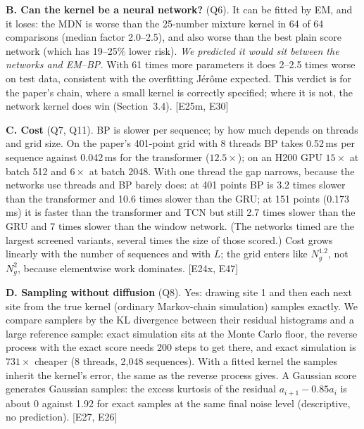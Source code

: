 \documentclass[11pt,a4paper]{article}
\newcommand{\src}[1]{{\footnotesize\color{gray}[#1]}}
\newcommand{\fals}[1]{{\small\itshape #1}}
\begin{document}
\textbf{B. Can the kernel be a neural network?} (Q6). It can be fitted by EM, and it loses: the MDN is worse than the 25-number
mixture kernel in 64 of 64 comparisons (median factor 2.0--2.5), and also worse than the best plain score network (which has
19--25\% lower risk). \fals{We predicted it would sit between the networks and EM--BP.} With 61 times more parameters it does 2--2.5 times worse on test data, consistent with the overfitting Jérôme expected. This verdict is for the paper's chain, where a small kernel is
correctly specified; where it is not, the network kernel does win (Section~3.4). \src{E25m, E30}

\textbf{C. Cost} (Q7, Q11). BP is slower per sequence; by how much depends on threads and grid size. On the paper's 401-point grid
with 8 threads BP takes 0.52\,ms per sequence against 0.042\,ms for the transformer ($12.5\times$); on an H200 GPU $15\times$ at
batch 512 and $6\times$ at batch 2048. With one thread the gap narrows, because the networks use threads and BP barely does: at
401 points BP is 3.2 times slower than the transformer and 10.6 times slower than the GRU; at 151 points (0.173\,ms) it is faster
than the transformer and TCN but still 2.7 times slower than the GRU and 7 times slower than the window network. (The networks timed are
the largest screened variants, several times the size of those scored.) Cost grows linearly with the number of sequences and with $L$; the grid enters
like $N_g^{1.2}$, not $N_g^2$, because elementwise work dominates. \src{E24x, E47}

\textbf{D. Sampling without diffusion} (Q8). Yes: drawing site 1 and then each next site from the true kernel (ordinary Markov-chain
simulation) samples exactly. We compare samplers by the KL divergence between their residual histograms and a large reference
sample: exact simulation sits at the Monte Carlo floor, the reverse process with the exact score needs 200 steps to get there, and
exact simulation is $731\times$ cheaper (8 threads, 2,048 sequences). With a fitted kernel the samples inherit the kernel's error, the same as the reverse process gives. A Gaussian score
generates Gaussian samples: the excess kurtosis of the residual $a_{i+1}-0.85a_i$ is about 0 against 1.92 for exact samples at the same final noise
level (descriptive, no prediction). \src{E27, E26}
\end{document}
